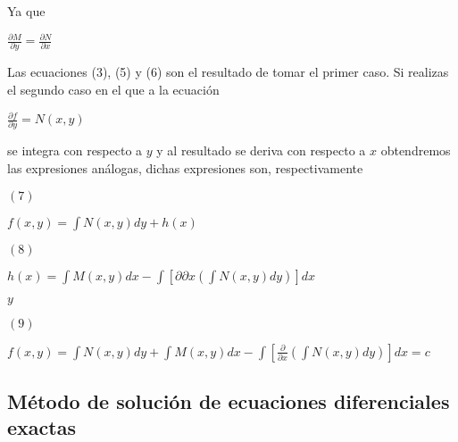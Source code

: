 \documentclass[l etterpaper,11pt]{article}
\begin{document}
Ya que
\begin{center}

$\frac{\partial M}{\partial y}=\frac{\partial N}{\partial x}$\\
\end{center}

Las ecuaciones (3), (5) y (6) son el resultado de tomar el primer caso. Si realizas el segundo caso en el que a la ecuación
\begin{center}

$\frac{\partial f}{\partial y}=N(x,y)$\\
\end{center}

se integra con respecto a $ y $ y al resultado se deriva con respecto a $ x $ obtendremos las expresiones análogas, dichas expresiones son, respectivamente
\begin{flushleft} 
$(7)$
\end{flushleft}

\begin{center}

$f(x,y)=\int N(x,y)dy+h(x)$\\
\end{center}
\begin{flushleft} 
$(8)$
\end{flushleft}

\begin{center}

$h(x)=\int M(x,y)dx-\int[\partial\partial x(\int N(x,y)dy)]dx$\\
\end{center}

\begin{center}

$y$\\
\end{center}

\begin{flushleft} 
$(9)$
\end{flushleft}

\begin{center}


$f(x,y)=\int N(x,y)dy+\int M(x,y)dx-\int[\frac{\partial}{\partial x}(\int N(x,y)dy)]dx=c$\\

\end{center}








\subsection{Método de solución de ecuaciones diferenciales exactas}
\end{document}
